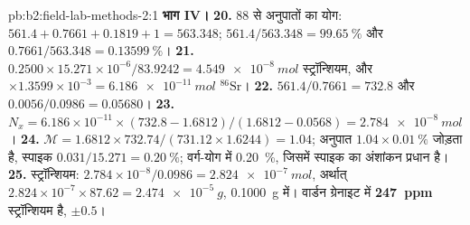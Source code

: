 \begin{solution}{pb:b2:field-lab-methods-2:1}
\noindent\textbf{भाग IV।}
\textbf{20.} 88 से अनुपातों का योग: $561.4 + 0.7661 + 0.1819 + 1 = 563.348$; $561.4/563.348 =
\qty{99.65}{\percent}$ और $0.7661/563.348 = \qty{0.13599}{\percent}$।
\textbf{21.} $0.2500 \times 15.271 \times 10^{-6}/83.9242 = \qty{4.549e-8}{mol}$ स्ट्रॉन्शियम, और
$\times 1.3599 \times 10^{-3} = \qty{6.186e-11}{mol}$ $^{86}\mathrm{Sr}$।
\textbf{22.} $561.4/0.7661 = 732.8$ और $0.0056/0.0986 = 0.05680$।
\textbf{23.} $N_x = 6.186 \times 10^{-11} \times (732.8 - 1.6812)/(1.6812 - 0.0568) =
\qty{2.784e-8}{mol}$।
\textbf{24.} $\mathcal M = 1.6812 \times 732.74/(731.12 \times 1.6244) = 1.04$; अनुपात
$1.04 \times \qty{0.01}{\percent}$ जोड़ता है, स्पाइक $0.031/15.271 = \qty{0.20}{\percent}$; वर्ग-योग में
\qty{0.20}{\percent}, जिसमें स्पाइक का अंशांकन प्रधान है।
\textbf{25.} स्ट्रॉन्शियम: $2.784 \times 10^{-8}/0.0986 = \qty{2.824e-7}{mol}$, अर्थात् $2.824 \times
10^{-7} \times 87.62 = \qty{2.474e-5}{g}$, \qty{0.1000}{g} में। वार्डन ग्रेनाइट में
\textbf{\qty[text-series-to-math=true]{247}{ppm}} स्ट्रॉन्शियम है, $\pm 0.5$।
\end{solution}
